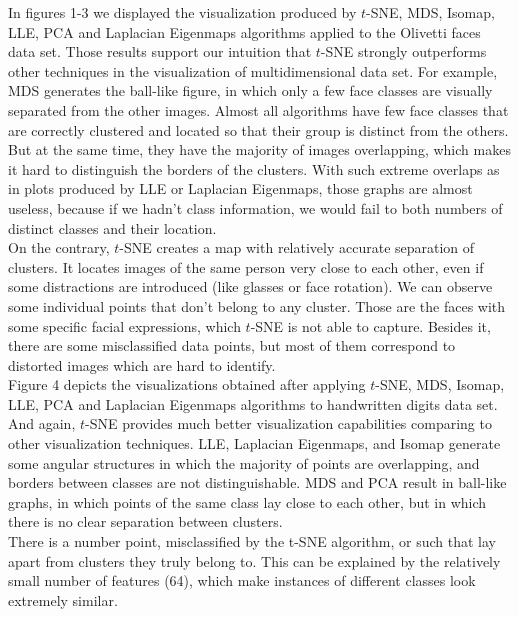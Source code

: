 In figures 1-3 we displayed the visualization produced by $t$-SNE, MDS, Isomap, LLE, PCA and Laplacian Eigenmaps algorithms applied to the Olivetti faces data set. Those results support our intuition that $t$-SNE strongly outperforms other techniques in the visualization of multidimensional data set. For example, MDS generates the ball-like figure, in which only a few face classes are visually separated from the other images. Almost all algorithms have few face classes that are correctly clustered and located so that their group is distinct from the others. But at the same time, they have the majority of images overlapping, which makes it hard to distinguish the borders of the clusters. With such extreme overlaps as in plots produced by LLE or Laplacian Eigenmaps, those graphs are almost useless, because if we hadn't class information, we would fail to both numbers of distinct classes and their location. \\

On the contrary, $t$-SNE creates a map with relatively accurate separation of clusters. It locates images of the same person very close to each other, even if some distractions are introduced (like glasses or face rotation). We can observe some individual points that don't belong to any cluster. Those are the faces with some specific facial expressions, which $t$-SNE is not able to capture. Besides it, there are some misclassified data points, but most of them correspond to distorted images which are hard to identify.\\

Figure 4 depicts the visualizations obtained after applying $t$-SNE, MDS, Isomap, LLE, PCA and Laplacian Eigenmaps algorithms to handwritten digits data set. And again, $t$-SNE provides much better visualization capabilities comparing to other visualization techniques. LLE, Laplacian Eigenmaps, and Isomap generate some angular structures in which the majority of points are overlapping, and borders between classes are not distinguishable. MDS and PCA result in ball-like graphs, in which points of the same class lay close to each other, but in which there is no clear separation between clusters. \\

There is a number point, misclassified by the t-SNE algorithm, or such that lay apart from clusters they truly belong to. This can be explained by the relatively small number of features (64), which make instances of different classes look extremely similar.\\

